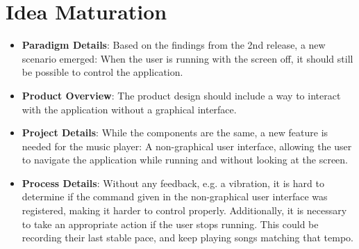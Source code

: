 \section{Idea Maturation}



\begin{itemize}
\item \textbf{Paradigm Details}: Based on the findings from the 2nd release, a new scenario emerged: When the user is running with the screen off, it should still be possible to control the application.

\item \textbf{Product Overview}: The product design should include a way to interact with the application without a graphical interface.

\item \textbf{Project Details}: While the components are the same, a new feature is needed for the music player: A non-graphical user interface, allowing the user to navigate the application while running and without looking at the screen.

\item \textbf{Process Details}: Without any  feedback, e.g. a vibration, it is hard to determine if the command given in the non-graphical user interface was registered, making it harder to control properly. \newline
Additionally, it is necessary to take an appropriate action if the user stops running. This could be recording their last stable pace, and keep playing songs matching that tempo.
\end{itemize}